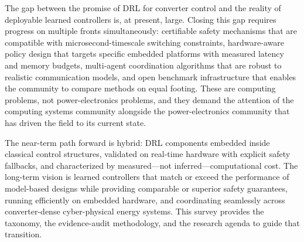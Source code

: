 \documentclass[manuscript,screen,review]{acmart}
\begin{document}
The gap between the promise of DRL for converter control and the reality of deployable learned controllers is, at present, large.
Closing this gap requires progress on multiple fronts simultaneously: certifiable safety mechanisms that are compatible with microsecond-timescale switching constraints, hardware-aware policy design that targets specific embedded platforms with measured latency and memory budgets, multi-agent coordination algorithms that are robust to realistic communication models, and open benchmark infrastructure that enables the community to compare methods on equal footing.
These are computing problems, not power-electronics problems, and they demand the attention of the computing systems community alongside the power-electronics community that has driven the field to its current state.

The near-term path forward is hybrid: DRL components embedded inside classical control structures, validated on real-time hardware with explicit safety fallbacks, and characterized by measured---not inferred---computational cost.
The long-term vision is learned controllers that match or exceed the performance of model-based designs while providing comparable or superior safety guarantees, running efficiently on embedded hardware, and coordinating seamlessly across converter-dense cyber-physical energy systems.
This survey provides the taxonomy, the evidence-audit methodology, and the research agenda to guide that transition.



\end{document}
